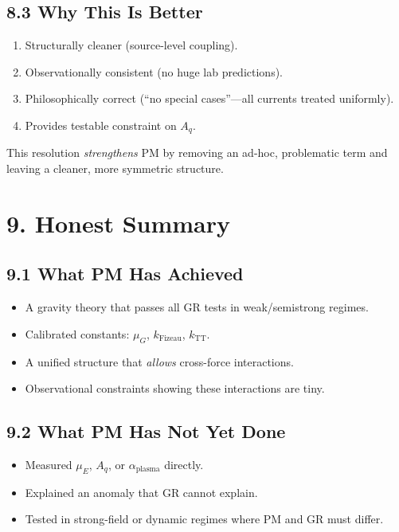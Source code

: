 \documentclass{article}
\begin{document}
\subsection*{8.3 Why This Is Better}

\begin{enumerate}
    \item Structurally cleaner (source-level coupling).
    \item Observationally consistent (no huge lab predictions).
    \item Philosophically correct (``no special cases''—all currents treated uniformly).
    \item Provides testable constraint on $A_q$.
\end{enumerate}

This resolution \emph{strengthens} PM by removing an ad-hoc, problematic term
and leaving a cleaner, more symmetric structure.

\section*{9. Honest Summary}

\subsection*{9.1 What PM Has Achieved}

\begin{itemize}
    \item A gravity theory that passes all GR tests in weak/semistrong regimes.
    \item Calibrated constants: $\mu_G$, $k_{\text{Fizeau}}$, $k_{\text{TT}}$.
    \item A unified structure that \emph{allows} cross-force interactions.
    \item Observational constraints showing these interactions are tiny.
\end{itemize}

\subsection*{9.2 What PM Has Not Yet Done}

\begin{itemize}
    \item Measured $\mu_E$, $A_q$, or $\alpha_{\text{plasma}}$ directly.
    \item Explained an anomaly that GR cannot explain.
    \item Tested in strong-field or dynamic regimes where PM and GR must differ.
\end{itemize}
\end{document}
